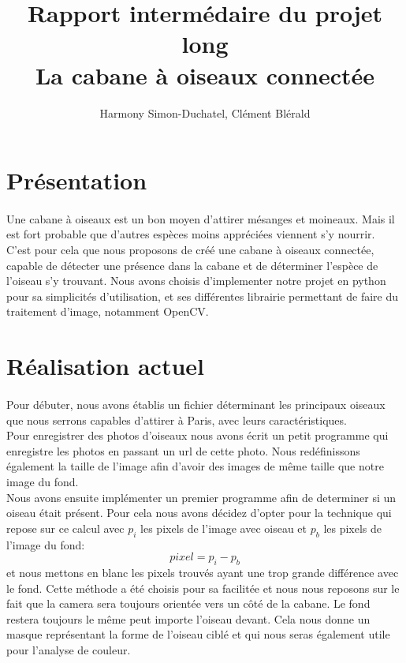 \documentclass{article}
\title{Rapport intermédaire du projet long \\ La cabane à oiseaux connectée }
\author{Harmony Simon-Duchatel, Clément Blérald}
\begin{document}
\maketitle


\section{Présentation}
\paragraph {}
Une cabane à oiseaux est un bon moyen d'attirer mésanges et moineaux. Mais il est fort probable que d'autres espèces moins appréciées viennent s'y nourrir. \\
C'est pour cela que nous proposons de créé une cabane à oiseaux connectée, capable de détecter une présence dans la cabane et de déterminer l'espèce de l'oiseau s'y trouvant. 
Nous avons choisis d'implementer notre projet en python pour sa simplicités d'utilisation, et ses différentes librairie permettant de faire du traitement d'image, notamment OpenCV.
\section{Réalisation actuel} 
\paragraph {}
Pour débuter, nous avons établis un fichier déterminant les principaux oiseaux que nous serrons capables d'attirer à Paris, avec leurs caractéristiques. \\
Pour enregistrer des photos d'oiseaux nous avons écrit un petit programme qui enregistre les photos en passant un url de cette photo. Nous redéfinissons également la taille de l'image afin d'avoir des images de même taille que notre image du fond.\\
Nous avons ensuite implémenter un premier programme afin de determiner si un oiseau était présent.
Pour cela nous avons décidez d'opter pour la technique qui repose sur ce calcul  avec $p_{i}$ les pixels de l'image avec oiseau et $p_{b}$ les pixels de l'image du fond: 
$$
pixel = p_{i} - p_{b}
$$
et nous mettons en blanc les pixels trouvés ayant une trop grande différence avec le fond. Cette méthode a été choisis pour sa facilitée et nous nous reposons sur le fait que la camera sera toujours orientée vers un côté de la cabane. Le fond restera toujours le même peut importe l'oiseau devant. Cela nous donne un masque représentant la forme de l'oiseau ciblé et qui nous seras également utile pour l'analyse de couleur.\\
\end{document}
